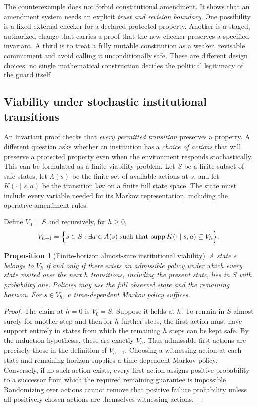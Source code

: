 \documentclass[11pt,letterpaper]{article}
\theoremstyle{plain}
\newtheorem{proposition}{Proposition}[section]
\theoremstyle{definition}
\theoremstyle{remark}
\begin{document}
The counterexample does not forbid constitutional amendment. It shows that an amendment system needs an explicit \emph{trust and revision boundary}. One possibility is a fixed external checker for a declared protected property. Another is a staged, authorized change that carries a proof that the new checker preserves a specified invariant. A third is to treat a fully mutable constitution as a weaker, revisable commitment and avoid calling it unconditionally safe. These are different design choices; no single mathematical construction decides the political legitimacy of the guard itself.

\subsection{Viability under stochastic institutional transitions}

An invariant proof checks that \emph{every permitted transition} preserves a property. A different question asks whether an institution has a \emph{choice of actions} that will preserve a protected property even when the environment responds stochastically. This can be formulated as a finite viability problem. Let $S$ be a finite subset of safe states, let $A(s)$ be the finite set of available actions at $s$, and let $K(\cdot\mid s,a)$ be the transition law on a finite full state space. The state must include every variable needed for its Markov representation, including the operative amendment rules.

Define $V_0=S$ and recursively, for $h\ge0$,
\begin{equation}\label{eq:viability}
V_{h+1}=\Bigl\{s\in S:\exists a\in A(s)\;\text{such that}\;
\operatorname{supp}K(\cdot\mid s,a)\subseteq V_h\Bigr\}.
\end{equation}
\begin{proposition}[Finite-horizon almost-sure institutional viability]\label{prop:viability}
A state $s$ belongs to $V_h$ if and only if there exists an admissible policy under which every state visited over the next $h$ transitions, including the present state, lies in $S$ with probability one. Policies may use the full observed state and the remaining horizon. For $s\in V_h$, a time-dependent Markov policy suffices.
\end{proposition}
\begin{proof}
The claim at $h=0$ is $V_0=S$. Suppose it holds at $h$. To remain in $S$ almost surely for another step and then for $h$ further steps, the first action must have support entirely in states from which the remaining $h$ steps can be kept safe. By the induction hypothesis, these are exactly $V_h$. Thus admissible first actions are precisely those in the definition of $V_{h+1}$. Choosing a witnessing action at each state and remaining horizon supplies a time-dependent Markov policy. Conversely, if no such action exists, every first action assigns positive probability to a successor from which the required remaining guarantee is impossible. Randomizing over actions cannot remove that positive failure probability unless all positively chosen actions are themselves witnessing actions.
\end{proof}
\end{document}
